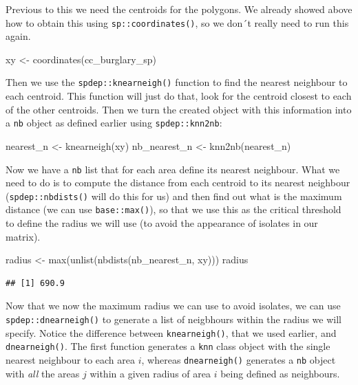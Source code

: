 \documentclass[
  krantz2]{krantz}
\makeatletter
\newenvironment{Shaded}{\begin{snugshade}}{\end{snugshade}}
\newcommand{\FunctionTok}[1]{\textcolor[rgb]{0,0,0}{#1}}
\newcommand{\NormalTok}[1]{#1}
\newcommand{\OtherTok}[1]{\textcolor[rgb]{0.37,0.37,0.37}{#1}}
\newenvironment{kframe}{%
\medskip{}
\setlength{\fboxsep}{.8em}
 \def\at@end@of@kframe{}%
 \ifinner\ifhmode%
  \def\at@end@of@kframe{\end{minipage}}%
  \begin{minipage}{\columnwidth}%
 \fi\fi%
 \def\FrameCommand##1{\hskip\@totalleftmargin \hskip-\fboxsep
 \colorbox{shadecolor}{##1}\hskip-\fboxsep
     \hskip-\linewidth \hskip-\@totalleftmargin \hskip\columnwidth}%
 \MakeFramed {\advance\hsize-\width
   \@totalleftmargin\z@ \linewidth\hsize
   \@setminipage}}%
 {\par\unskip\endMakeFramed%
 \at@end@of@kframe}
\renewenvironment{Shaded}{\begin{kframe}}{\end{kframe}}
\makeatother
\begin{document}
Previous to this we need the centroids for the polygons. We already showed above how to obtain this using \texttt{sp::coordinates()}, so we don´t really need to run this again.

\begin{Shaded}
\begin{Highlighting}[]
\NormalTok{xy }\OtherTok{\textless{}{-}} \FunctionTok{coordinates}\NormalTok{(cc\_burglary\_sp)}
\end{Highlighting}
\end{Shaded}

Then we use the \texttt{spdep::knearneigh()} function to find the nearest neighbour to each centroid. This function will just do that, look for the centroid closest to each of the other centroids. Then we turn the created object with this information into a \texttt{nb} object as defined earlier using \texttt{spdep::knn2nb}:

\begin{Shaded}
\begin{Highlighting}[]
\NormalTok{nearest\_n }\OtherTok{\textless{}{-}} \FunctionTok{knearneigh}\NormalTok{(xy)}
\NormalTok{nb\_nearest\_n }\OtherTok{\textless{}{-}} \FunctionTok{knn2nb}\NormalTok{(nearest\_n)}
\end{Highlighting}
\end{Shaded}

Now we have a \texttt{nb} list that for each area define its nearest neighbour. What we need to do is to compute the distance from each centroid to its nearest neighbour (\texttt{spdep::nbdists()} will do this for us) and then find out what is the maximum distance (we can use \texttt{base::max()}), so that we use this as the critical threshold to define the radius we will use (to avoid the appearance of isolates in our matrix).

\begin{Shaded}
\begin{Highlighting}[]
\NormalTok{radius }\OtherTok{\textless{}{-}} \FunctionTok{max}\NormalTok{(}\FunctionTok{unlist}\NormalTok{(}\FunctionTok{nbdists}\NormalTok{(nb\_nearest\_n, xy)))}
\NormalTok{radius}
\end{Highlighting}
\end{Shaded}

\begin{verbatim}
## [1] 690.9
\end{verbatim}

Now that we now the maximum radius we can use to avoid isolates, we can use \texttt{spdep::dnearneigh()} to generate a list of neigbhours within the radius we will specify. Notice the difference between \texttt{knearneigh()}, that we used earlier, and \texttt{dnearneigh()}. The first function generates a \texttt{knn} class object with the single nearest neighbour to each area \(i\), whereas \texttt{dnearneigh()} generates a \texttt{nb} object with \emph{all} the areas \(j\) within a given radius of area \(i\) being defined as neighbours.
\end{document}
